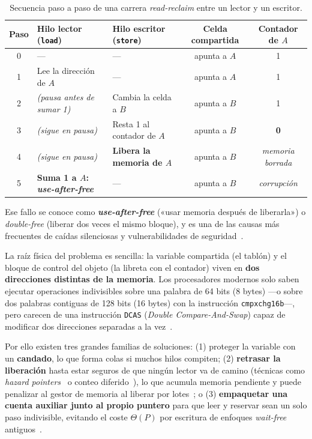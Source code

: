 \documentclass[11pt,a4paper]{article}
\begin{document}
\begin{table}[H]
\centering
\caption{Secuencia paso a paso de una carrera \emph{read-reclaim} entre un lector y un escritor.}
\label{tab:carrera}
\footnotesize
\begin{tabularx}{\linewidth}{@{}c l l c c@{}}
\toprule
\textbf{Paso} & \textbf{Hilo lector (\texttt{load})} & \textbf{Hilo escritor (\texttt{store})} & \textbf{Celda compartida} & \textbf{Contador de $A$} \\
\midrule
0 & — & — & apunta a $A$ & 1 \\
1 & Lee la dirección de $A$ & — & apunta a $A$ & 1 \\
2 & \emph{(pausa antes de sumar 1)} & Cambia la celda a $B$ & apunta a $B$ & 1 \\
3 & \emph{(sigue en pausa)} & Resta 1 al contador de $A$ & apunta a $B$ & \textbf{0} \\
4 & \emph{(sigue en pausa)} & \textbf{Libera la memoria de $A$} & apunta a $B$ & \emph{memoria borrada} \\
5 & \textbf{Suma 1 a $A$: \emph{use-after-free}} & — & apunta a $B$ & \emph{corrupción} \\
\bottomrule
\end{tabularx}
\end{table}

Ese fallo se conoce como \textbf{\emph{use-after-free}} («usar memoria después de liberarla») o \emph{double-free} (liberar dos veces el mismo bloque), y es una de las causas más frecuentes de caídas silenciosas y vulnerabilidades de seguridad~\cite{chen2023uaf}.

La raíz física del problema es sencilla: la variable compartida (el tablón) y el bloque de control del objeto (la libreta con el contador) viven en \textbf{dos direcciones distintas de la memoria}. Los procesadores modernos solo saben ejecutar operaciones indivisibles sobre una palabra de 64 bits (8 bytes) —o sobre dos palabras contiguas de 128 bits (16 bytes) con la instrucción \texttt{cmpxchg16b}—, pero carecen de una instrucción \texttt{DCAS} (\emph{Double Compare-And-Swap}) capaz de modificar dos direcciones separadas a la vez~\cite{detlefs2001lockfree}.

Por ello existen tres grandes familias de soluciones: (1) proteger la variable con un \textbf{candado}, lo que forma colas si muchos hilos compiten; (2) \textbf{retrasar la liberación} hasta estar seguros de que ningún lector va de camino (técnicas como \emph{hazard pointers}~\cite{michael2004hazard} o conteo diferido~\cite{anderson2021cdrc,anderson2022turning}), lo que acumula memoria pendiente y puede penalizar al gestor de memoria al liberar por lotes~\cite{kim2024epochs}; o (3) \textbf{empaquetar una cuenta auxiliar junto al propio puntero} para que leer y reservar sean un solo paso indivisible, evitando el coste $\Theta(P)$ por escritura de enfoques \emph{wait-free} antiguos~\cite{sundell2005waitfree}.
\end{document}
